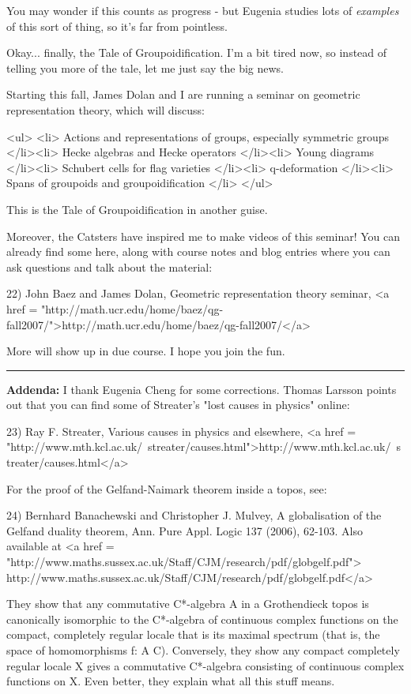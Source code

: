 You may wonder if this counts as progress - but Eugenia
studies lots of \emph{examples} of this sort of thing, so it's far
from pointless.  

Okay... finally, the Tale of Groupoidification.  I'm a bit tired
now, so instead of telling you more of the tale, let me just say
the big news.

Starting this fall, James Dolan and I are running a seminar on
geometric representation theory, which will discuss:

<ul>
<li>
 Actions and representations of groups, especially symmetric groups
</li><li>
 Hecke algebras and Hecke operators
</li><li>
 Young diagrams
</li><li>
 Schubert cells for flag varieties
</li><li>
 q-deformation 
</li><li>
 Spans of groupoids and groupoidification
</li>
</ul>

This is the Tale of Groupoidification in another guise.

Moreover, the Catsters have inspired me to make videos of this 
seminar!  You can already find some here, along with course 
notes and blog entries where you can ask questions and talk about 
the material:

22) John Baez and James Dolan, Geometric representation theory seminar,
<a href = "http://math.ucr.edu/home/baez/qg-fall2007/">http://math.ucr.edu/home/baez/qg-fall2007/</a>

More will show up in due course.  I hope you join the fun.

\par\noindent\rule{\textwidth}{0.4pt}
\textbf{Addenda:} I thank Eugenia Cheng for some corrections.
Thomas Larsson points out that you can find some of Streater's 
"lost causes in physics" online:

23) Ray F. Streater, Various causes in physics and elsewhere,
<a href = "http://www.mth.kcl.ac.uk/~streater/causes.html">http://www.mth.kcl.ac.uk/~streater/causes.html</a>

For the proof of the Gelfand-Naimark theorem inside a topos, see:

24) Bernhard Banachewski and Christopher J. Mulvey, A globalisation
of the Gelfand duality theorem, Ann. Pure Appl. Logic 137 (2006), 
62-103.  Also available at 
<a href = "http://www.maths.sussex.ac.uk/Staff/CJM/research/pdf/globgelf.pdf">
http://www.maths.sussex.ac.uk/Staff/CJM/research/pdf/globgelf.pdf</a>

They show that any commutative C*-algebra A in a Grothendieck topos is
canonically isomorphic to the C*-algebra of continuous 
complex functions on the compact, completely regular locale that is its
maximal spectrum (that is, the space of homomorphisms f: A \to  C).
Conversely, they show any compact completely regular locale X gives
a commutative C*-algebra consisting of continuous complex functions
on X.  Even better, they explain what all this stuff means.

